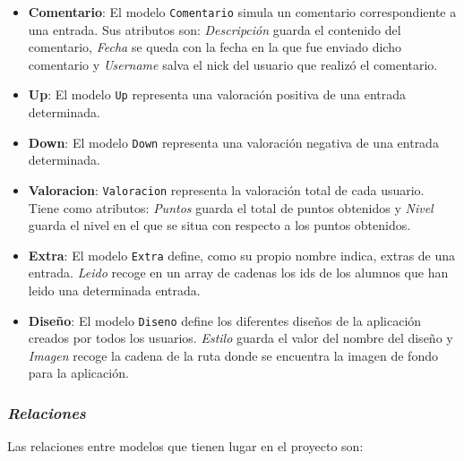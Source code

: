 \documentclass[a4paper, 12pt]{book}
\begin{document}
\begin{itemize}
  \textit{Visitas} es un entero que guarda el n\'umero de visitas totales de la entrada y que corresponde con la cantidad de visitantes.
  \item {\bfseries Comentario}: El modelo \texttt{Comentario} simula un comentario correspondiente a una entrada. Sus atributos son: \textit{Descripci\'on}
  guarda el contenido del comentario, \textit{Fecha} se queda con la fecha en la que fue enviado dicho comentario y \textit{Username} salva el nick del 
  usuario que realiz\'o el comentario.
  \item {\bfseries Up}: El modelo \texttt{Up} representa una valoraci\'on positiva de una entrada determinada.
  \item {\bfseries Down}: El modelo \texttt{Down} representa una valoraci\'on negativa de una entrada determinada.
  \item {\bfseries Valoracion}: \texttt{Valoracion} representa la valoraci\'on total de cada usuario. Tiene como atributos: \textit{Puntos} guarda el total
  de puntos obtenidos y \textit{Nivel} guarda el nivel en el que se situa con respecto a los puntos obtenidos.
  \item {\bfseries Extra}: El modelo \texttt{Extra} define, como su propio nombre indica, extras de una entrada. \textit{Leido} recoge en un array de 
  cadenas los ids de los alumnos que han leido una determinada entrada.
  \item {\bfseries Dise\~no}: El modelo \texttt{Diseno} define los diferentes dise\~nos de la aplicaci\'on creados por todos los usuarios. \textit{Estilo} 
  guarda el valor del nombre del dise\~no y \textit{Imagen} recoge la cadena de la ruta donde se encuentra la imagen de fondo para la aplicaci\'on.
\end{itemize}

\subsubsection{\textit{Relaciones}} 
\label{sec:relaciones}
Las relaciones entre modelos que tienen lugar en el proyecto son:
\end{document}
